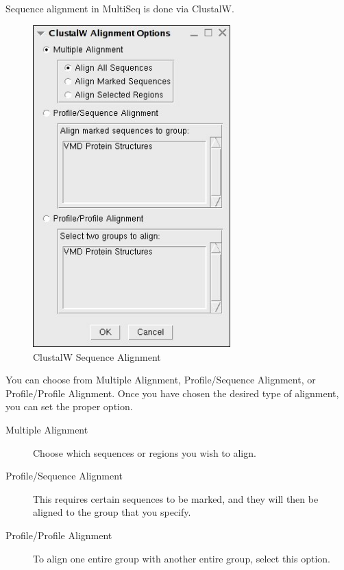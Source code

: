 Sequence alignment in MultiSeq is done via ClustalW.

 \begin{figure}[here]
 \centerline{\includegraphics [width=3in]{./pictures/clustalw1.jpg}}
 \caption{ClustalW Sequence Alignment}
\label{clustal}
\end{figure}

You can choose from Multiple Alignment, Profile/Sequence Alignment, or
Profile/Profile Alignment.  Once you have chosen the desired type
of alignment, you can set the proper option.

\begin{description}
     \item[Multiple Alignment]  Choose which sequences or regions you
     wish to align.
     \item[Profile/Sequence Alignment] This requires certain sequences
     to be marked, and they will then be aligned to the group that you
     specify.
     \item[Profile/Profile Alignment] To align one entire group with
     another entire group, select this option.
\end{description}


